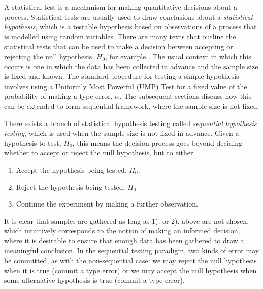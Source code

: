 

A statistical test is a mechanism for making quantitative decisions about a process. Statistical tests are usually used to draw conclusions about a \textit{statistical hypothesis}, which is a testable hypothesis based on observations of a process that is modelled using random variables. There are many texts that outline the statistical tests that can be used to make a decision between accepting or rejecting the null hypothesis, $H_0$, for example \cite{IntroductionToMathematicalStatistics}. The usual context in which this occurs is one in which the data has been collected in advance and the sample size is fixed and known. The standard procedure for testing a simple hypothesis involves using a Uniformly Most Powerful (UMP) Test for a fixed value of the probability of making a type  error, $\alpha$. The subsequent sections discuss how this can be extended to form sequential framework, where the sample size is not fixed. \par

There exists a branch of statistical hypothesis testing called \textit{sequential hypothesis testing}, which is used when the sample size is not fixed in advance. Given a hypothesis to test, $H_0$, this means the decision process goes beyond deciding whether to accept or reject the null hypothesis, but to either
\begin{enumerate}
    \item Accept the hypothesis being tested, $H_0$.
    \item Reject the hypothesis being tested, $H_0$
    \item Continue the experiment by making a further observation.
\end{enumerate}

It is clear that samples are gathered as long as 1). or 2). above are not chosen, which intuitively corresponds to the notion of making an informed decision, where it is desirable to ensure that enough data has been gathered to draw a meaningful conclusion. In the sequential testing paradigm, two kinds of error may be committed, as with the non-sequential case: we may reject the null hypothesis when it is true (commit a type  error) or we may accept the null hypothesis when some alternative hypothesis is true (commit a type  error). 

